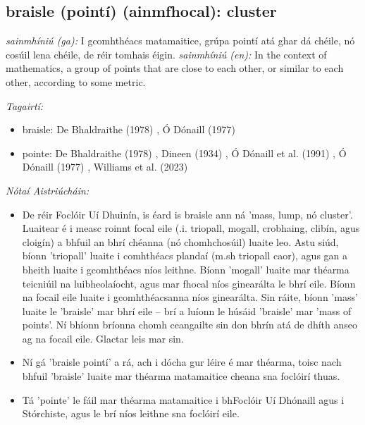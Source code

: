 \documentclass{article}
\begin{document}
\subsection*{braisle (pointí) (ainmfhocal): cluster} 
 \noindent \textit{sainmhíniú (ga):} I gcomhthéacs matamaitice, grúpa pointí atá ghar dá chéile, nó cosúil lena chéile, de réir tomhais éigin.
\newline\newline
 \noindent \textit{sainmhíniú (en):} In the context of mathematics, a group of points that are close to each other, or similar to each other, according to some metric.
\newline

 \noindent \textit{Tagairtí:}
\begin{itemize}
	\item braisle: De Bhaldraithe (1978) \cite{de-bhaldraithe}, Ó Dónaill (1977) \cite{odonaill}
	\item pointe: De Bhaldraithe (1978) \cite{de-bhaldraithe}, Dineen (1934) \cite{dineen}, Ó Dónaill et al. (1991) \cite{focloir-beag}, Ó Dónaill (1977) \cite{odonaill}, Williams et al. (2023) \cite{storchiste}
\end{itemize}

 \noindent \textit{Nótaí Aistriúcháin:}
\begin{itemize}
	\item De réir Foclóir Uí Dhuinín, is éard is braisle ann ná 'mass, lump, nó cluster'. Luaitear é i measc roinnt focal eile (.i. triopall, mogall, crobhaing, clibín, agus cloigín) a bhfuil an bhrí chéanna (nó chomhchosúil) luaite leo. Astu siúd, bíonn 'triopall' luaite i comhthéacs plandaí (m.sh triopall caor), agus gan a bheith luaite i gcomhthéacs níos leithne. Bíonn 'mogall' luaite mar théarma teicniúil na luibheolaíocht, agus mar fhocal níos ginearálta le bhrí eile. Bíonn na focail eile luaite i gcomhthéacsanna níos ginearálta. Sin ráite, bíonn 'mass' luaite le 'braisle' mar bhrí eile -- brí a luíonn le húsáid 'braisle' mar 'mass of points'. Ní bhíonn bríonna chomh ceangailte sin don bhrín atá de dhíth anseo ag na focail eile. Glactar leis mar sin.
	\item Ní gá 'braisle pointí' a rá, ach i dócha gur léire é mar théarma, toisc nach bhfuil 'braisle' luaite mar théarma matamaitice cheana sna foclóirí thuas.
	\item Tá 'pointe' le fáil mar théarma matamaitice i bhFoclóir Uí Dhónaill agus i Stórchiste, agus le brí níos leithne sna foclóirí eile.
\end{itemize}
\end{document}
